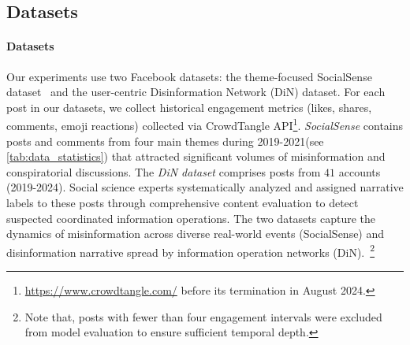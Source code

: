 \subsection{Datasets}
\label{subsec:datasets}





\paragraph{Datasets}
Our experiments use two Facebook datasets: the theme-focused SocialSense dataset~\citep{kong2022slipping} and the user-centric Disinformation Network (DiN) dataset.
For each post in our datasets, we collect historical engagement metrics (likes, shares, comments, emoji reactions) collected via CrowdTangle API\footnote{\url{https://www.crowdtangle.com/} before its termination in August 2024.}. 
\emph{SocialSense} contains posts and comments from four main themes during 2019-2021(see \cref{tab:data_statistics}) that attracted significant volumes of misinformation and conspiratorial discussions. 
The \emph{DiN dataset} comprises posts from $41$ accounts (2019-2024). Social science experts systematically analyzed and assigned narrative labels to these posts through comprehensive content evaluation to detect suspected coordinated information operations. 
The two datasets capture the dynamics of misinformation across diverse real-world events (SocialSense) and disinformation narrative spread by information operation networks (DiN).~\footnote{Note that, posts with fewer than four engagement intervals were excluded from model evaluation to ensure sufficient temporal depth. }

